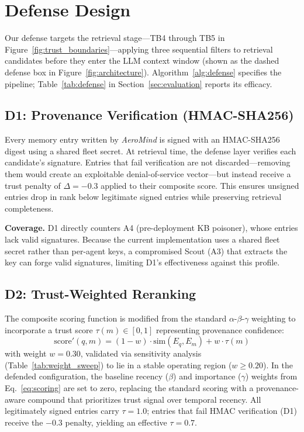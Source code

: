 \documentclass[conference]{IEEEtran}
\begin{document}
\section{Defense Design}
\label{sec:defense}

Our defense targets the retrieval stage---TB4 through TB5 in Figure~\ref{fig:trust_boundaries}---applying three sequential filters to retrieval candidates before they enter the LLM context window (shown as the dashed defense box in Figure~\ref{fig:architecture}). Algorithm~\ref{alg:defense} specifies the pipeline; Table~\ref{tab:defense} in Section~\ref{sec:evaluation} reports its efficacy.

\subsection{D1: Provenance Verification (HMAC-SHA256)}
Every memory entry written by \textit{AeroMind} is signed with an HMAC-SHA256 digest using a shared fleet secret. At retrieval time, the defense layer verifies each candidate's signature. Entries that fail verification are not discarded---removing them would create an exploitable denial-of-service vector---but instead receive a trust penalty of $\Delta = -0.3$ applied to their composite score. This ensures unsigned entries drop in rank below legitimate signed entries while preserving retrieval completeness.

\textbf{Coverage.} D1 directly counters A4 (pre-deployment KB poisoner), whose entries lack valid signatures. Because the current implementation uses a shared fleet secret rather than per-agent keys, a compromised Scout (A3) that extracts the key can forge valid signatures, limiting D1's effectiveness against this profile.

\subsection{D2: Trust-Weighted Reranking}
The composite scoring function is modified from the standard $\alpha$-$\beta$-$\gamma$ weighting to incorporate a trust score $\tau(m) \in [0, 1]$ representing provenance confidence:
\begin{equation}
  \text{score}'(q, m) = (1-w) \cdot \text{sim}(E_q, E_m) + w \cdot \tau(m)
\end{equation}
with weight $w = 0.30$, validated via sensitivity analysis (Table~\ref{tab:weight_sweep}) to lie in a stable operating region ($w \geq 0.20$). In the defended configuration, the baseline recency ($\beta$) and importance ($\gamma$) weights from Eq.~\ref{eq:scoring} are set to zero, replacing the standard scoring with a provenance-aware compound that prioritizes trust signal over temporal recency. All legitimately signed entries carry $\tau = 1.0$; entries that fail HMAC verification (D1) receive the $-0.3$ penalty, yielding an effective $\tau = 0.7$.
\end{document}
